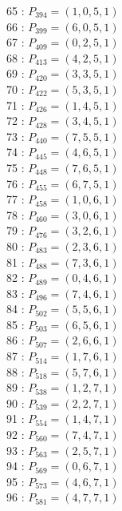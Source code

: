 \documentclass{article}
\begin{document}
{\begin{multicols}{3}
65 : $P_{394}=( 1, 0, 5, 1 )$\\
66 : $P_{399}=( 6, 0, 5, 1 )$\\
67 : $P_{409}=( 0, 2, 5, 1 )$\\
68 : $P_{413}=( 4, 2, 5, 1 )$\\
69 : $P_{420}=( 3, 3, 5, 1 )$\\
70 : $P_{422}=( 5, 3, 5, 1 )$\\
71 : $P_{426}=( 1, 4, 5, 1 )$\\
72 : $P_{428}=( 3, 4, 5, 1 )$\\
73 : $P_{440}=( 7, 5, 5, 1 )$\\
74 : $P_{445}=( 4, 6, 5, 1 )$\\
75 : $P_{448}=( 7, 6, 5, 1 )$\\
76 : $P_{455}=( 6, 7, 5, 1 )$\\
77 : $P_{458}=( 1, 0, 6, 1 )$\\
78 : $P_{460}=( 3, 0, 6, 1 )$\\
79 : $P_{476}=( 3, 2, 6, 1 )$\\
80 : $P_{483}=( 2, 3, 6, 1 )$\\
81 : $P_{488}=( 7, 3, 6, 1 )$\\
82 : $P_{489}=( 0, 4, 6, 1 )$\\
83 : $P_{496}=( 7, 4, 6, 1 )$\\
84 : $P_{502}=( 5, 5, 6, 1 )$\\
85 : $P_{503}=( 6, 5, 6, 1 )$\\
86 : $P_{507}=( 2, 6, 6, 1 )$\\
87 : $P_{514}=( 1, 7, 6, 1 )$\\
88 : $P_{518}=( 5, 7, 6, 1 )$\\
89 : $P_{538}=( 1, 2, 7, 1 )$\\
90 : $P_{539}=( 2, 2, 7, 1 )$\\
91 : $P_{554}=( 1, 4, 7, 1 )$\\
92 : $P_{560}=( 7, 4, 7, 1 )$\\
93 : $P_{563}=( 2, 5, 7, 1 )$\\
94 : $P_{569}=( 0, 6, 7, 1 )$\\
95 : $P_{573}=( 4, 6, 7, 1 )$\\
96 : $P_{581}=( 4, 7, 7, 1 )$\\
\end{multicols}


%


%


}%
\end{document}
